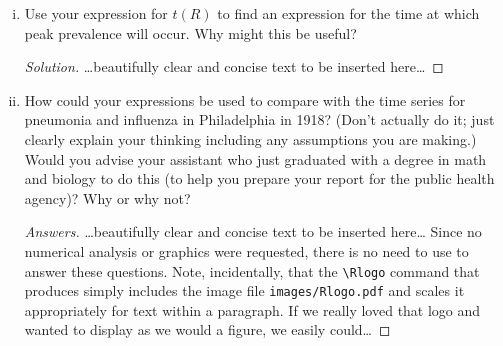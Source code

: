 \documentclass[12pt]{article}
\begin{document}
\begin{enumerate}[(a)]
\begin{enumerate}[(i)]
{\begin{proof}[Solution]
{	\begin{align}
		\frac{dS}{dR} &= \frac{dS}{dt} \frac{dt}{dR} \\
				     &= -\R_0 S \\
		\int_{S_0}^{S} \frac{dS'}{S'} &= -\R_0 \int_{0}^{R} dR' \\
		\ln{\frac{S}{S_0}} &= -\R_0 R \\
		S &= S_0 e^{-\R_0 R} = 1 - R - \frac{dR}{dt} \\
		\frac{dR}{dt} &= 1 - R - S_0 e^{-\R_0 R} \\
		\int_{0}^{t} dt = t(R) &= \int_{0}^{R} \frac{dR'}{1 - R' - S_0 e^{-\R_0 R'}}
	\end{align}

}
\end{proof}
}

\item Use your expression for $t(R)$ to find an expression for the time at which peak prevalence will occur.  Why might this be useful?

{\color{blue}
\begin{proof}[Solution]
{\color{magenta}\dots beautifully clear and concise text to be inserted here\dots}
\end{proof}
}

\item How could your expressions be used to compare with the time series for pneumonia and influenza in Philadelphia in 1918?  (Don't actually do it; just clearly explain your thinking including any assumptions you are making.)  Would you advise your assistant who just graduated with a degree in math and biology to do this (to help you prepare your report for the public health agency)?  Why or why not?

{\color{blue}
\begin{proof}[Answers]
{\color{magenta}\dots beautifully clear and concise text to be inserted here\dots}
Since no numerical analysis or graphics were requested, there is no need to use \Rlogo to answer these questions.  Note, incidentally, that the \verb|\Rlogo| command that produces \Rlogo simply includes the image file \texttt{images/Rlogo.pdf} and scales it appropriately for text within a paragraph.  If we really loved that logo and wanted to display as we would a figure, we easily could\dots
\end{proof}
}
\begin{center}
\end{center}


\end{enumerate}
\end{enumerate}
\end{document}
